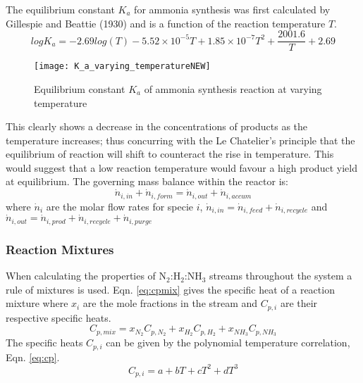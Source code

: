 The equilibrium constant $K_a$ for ammonia synthesis was first calculated by Gillespie and Beattie (1930)\cite{Gillespie1930} and is a function of the reaction temperature $T$.
\begin{equation}
logK_a = -2.69log(T) - 5.52\times10^{-5}T + 1.85\times10^{-7}T^2+\frac{2001.6}{T}+2.69
\end{equation}
{\begin{figure}[h]
\begin{center}
\texttt{[image: K\_a\_varying\_temperatureNEW]}
		\caption{Equilibrium constant $K_a$ of ammonia synthesis reaction at varying temperature}
\end{center}
\end{figure}}

This clearly shows a decrease in the concentrations of products as the temperature increases; thus concurring with the Le Chatelier's principle that the equilibrium of reaction will shift to counteract the rise in temperature. This would suggest that a low reaction temperature would favour a high product yield at equilibrium. The governing mass balance within the reactor is:
\begin{equation}
 \dot{n}_{i,in}+\dot{n}_{i,form}=\dot{n}_{i,out}+\dot{n}_{i,accum}   
\end{equation}
where $\dot{n}_i$ are the molar flow rates for specie $i$, $\dot{n}_{i,in} = \dot{n}_{i,feed} + \dot{n}_{i,recycle} $ and $\dot{n}_{i,out} = \dot{n}_{i,prod} + \dot{n}_{i,recycle} + \dot{n}_{i,purge}$

\subsubsection{Reaction Mixtures}
When calculating the properties of N$_2$:H$_2$:NH$_3$ streams throughout the system a rule of mixtures is used. Eqn. \ref{eq:cpmix} gives the specific heat of a reaction mixture where $x_{i}$ are the mole fractions in the stream and $C_{p,i}$ are their respective specific heats. 
\begin{equation}
\label{eq:cpmix}
	C_{p,mix} = x_{N_2}C_{p,N_2} + x_{H_2}C_{p,H_2} + x_{NH_3}C_{p,NH_3}
\end{equation}
The specific heats  $C_{p,i}$ can be given by the polynomial temperature correlation, Eqn. \ref{eq:cp}.
\begin{equation}
\label{eq:cp}
C_{p,i} = a + bT + cT^2 + dT^3
\end{equation}

